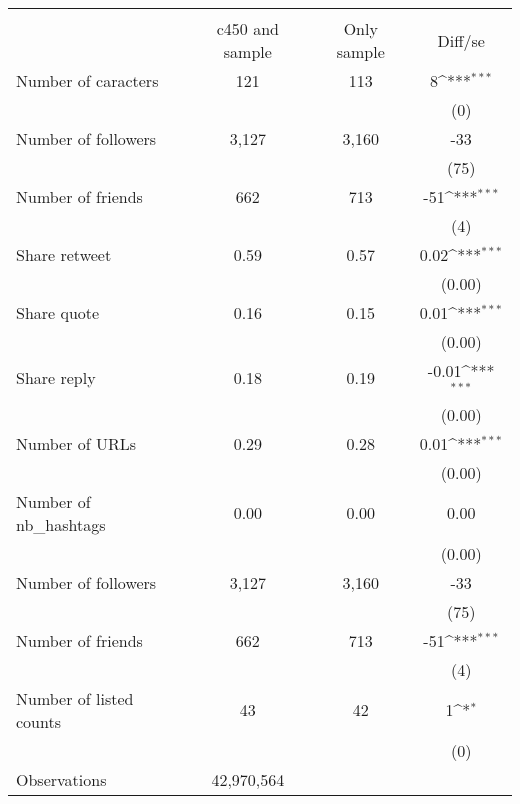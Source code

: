 {
\def\sym#1{\ifmmode^{#1}\else\(^{#1}\)\fi}
\begin{tabular}{l*{1}{ccc}}
\hline\hline
                    &\multicolumn{3}{c}{}                           \\
                    &c450 and sample& Only sample&     Diff/se         \\
\hline
Number of caracters &         121&         113&           8\sym{***}\\
                    &            &            &         (0)         \\
Number of followers &       3,127&       3,160&         -33         \\
                    &            &            &        (75)         \\
Number of friends   &         662&         713&         -51\sym{***}\\
                    &            &            &         (4)         \\
Share retweet       &        0.59&        0.57&        0.02\sym{***}\\
                    &            &            &      (0.00)         \\
Share quote         &        0.16&        0.15&        0.01\sym{***}\\
                    &            &            &      (0.00)         \\
Share reply         &        0.18&        0.19&       -0.01\sym{***}\\
                    &            &            &      (0.00)         \\
Number of URLs      &        0.29&        0.28&        0.01\sym{***}\\
                    &            &            &      (0.00)         \\
Number of nb\_hashtags&        0.00&        0.00&        0.00         \\
                    &            &            &      (0.00)         \\
Number of followers &       3,127&       3,160&         -33         \\
                    &            &            &        (75)         \\
Number of friends   &         662&         713&         -51\sym{***}\\
                    &            &            &         (4)         \\
Number of listed counts&          43&          42&           1\sym{*}  \\
                    &            &            &         (0)         \\
\hline
Observations        &  42,970,564&            &                     \\
\hline\hline
\end{tabular}
}
